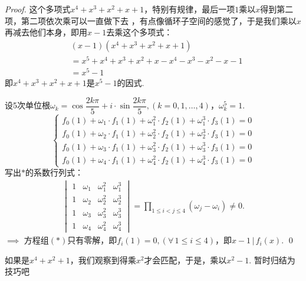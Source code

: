 \begin{proof}
	这个多项式$x^4+x^3+x^2+x+1$，特别有规律，最后一项$1$乘以$x$得到第二项，第二项依次乘可以一直做下去
	，有点像循环子空间的感觉了，于是我们乘以$x$再减去他们本身，即用$x-1$去乘这个多项式：
	\begin{align*}
		&(x-1)(x^4+x^3+x^2+x+1)\\
		&=x^5 + x^4 +x^3+x^2+x - x^4 - x^3 - x^2- x - 1\\
		&=x^5-1
	\end{align*}
	即$x^4+x^3+x^2+x+1$是$x^5-1$的因式.

	设5次单位根$\omega_k = \cos \dfrac{2k \pi}{5} + i \cdot \sin \dfrac{2k \pi}{5},(k=0,1,\dots,4)$，$\omega_k^5=1$.
	\begin{equation}
		\begin{cases}
			f_0(1) + \omega_1 \cdot f_1(1) + \omega_1^2 \cdot f_2(1) + 
			\omega_1^3 \cdot f_3(1) = 0 \\
			f_0(1) + \omega_2 \cdot f_1(1) + \omega_2^2 \cdot f_2(1) + 
			\omega_2^3 \cdot f_3(1) = 0 \\
			f_0(1) + \omega_3 \cdot f_1(1) + \omega_3^2 \cdot f_2(1) + 
			\omega_3^3 \cdot f_3(1) = 0 \\
			f_0(1) + \omega_4 \cdot f_1(1) + \omega_4^2 \cdot f_2(1) + 
			\omega_4^3 \cdot f_3(1) = 0 \tag{\textasteriskcentered}
		\end{cases}
	\end{equation}
	写出$\ast $的系数行列式：
	\begin{align*}
		\begin{vmatrix}
			1 & \omega_1 & \omega_1^2 & \omega_1^3 \\
			1 & \omega_2 & \omega_2^2 & \omega_2^3 \\
			1 & \omega_3 & \omega_3^2 & \omega_3^3 \\
			1 & \omega_4 & \omega_4^2 & \omega_4^3 
		\end{vmatrix}
		=\prod _{1\leq i < j \leq 4} (\omega_j - \omega_i)\neq 0.
	\end{align*}
	$\implies$ 方程组$(\ast) $只有零解，即$f_i(1)=0,(\forall \,1\leq i \leq 4)$，即$x-1 \, | \, f_i(x)$.
	\qed{}
\end{proof}

\begin{remark}
	如果是$x^4+x^2+1$，我们观察到得乘$x^2$才会匹配，于是，乘以$x^2-1$. 暂时归结为技巧吧
\end{remark}